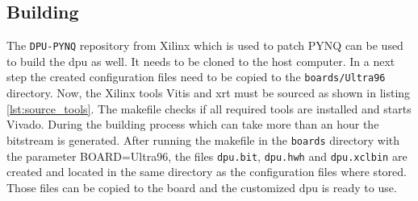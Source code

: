 \subsection{Building}
\label{subsec:embedded_platform:dpu:building}

The \texttt{DPU-PYNQ} repository from Xilinx which is used to patch PYNQ can be used to build the \acrshort{dpu} as well.
It needs to be cloned to the host computer.
In a next step the created configuration files need to be copied to the \texttt{boards/Ultra96} directory.
Now, the Xilinx tools Vitis and \acrshort{xrt} must be sourced as shown in listing \ref{lst:source_tools}.
The makefile checks if all required tools are installed and starts Vivado.
During the building process which can take more than an hour the bitstream is generated. 
After running the makefile in the \texttt{boards} directory with the parameter BOARD=Ultra96, the files \texttt{dpu.bit}, \texttt{dpu.hwh} and \texttt{dpu.xclbin} are created and located in the same directory as the configuration files where stored.
Those files can be copied to the board and the customized \acrshort{dpu} is ready to use.
